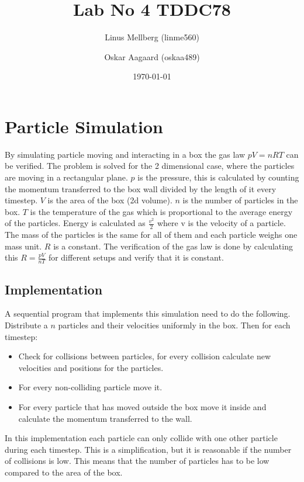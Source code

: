 \documentclass[a4paper,11pt]{article}
\begin{document}
\title{Lab No 4 TDDC78}
\author{Linus Mellberg (linme560) \and Oskar Aagaard (oskaa489)}
\date{\today}
\maketitle
\pagebreak
\thispagestyle{tcr}
\pagestyle{tcr}

\section{Particle Simulation}
By simulating particle moving and interacting in a box the gas law $pV = nRT$ can be verified.
The problem is solved for the 2 dimensional case, where the particles are moving in a rectangular plane.
$p$ is the pressure, this is calculated by counting the momentum transferred to the box wall divided by the length of it every timestep.
$V$ is the area of the box (2d volume).
$n$ is the number of particles in the box.
$T$ is the temperature of the gas which is proportional to the average energy of the particles.
Energy is calculated as $\frac{v^2}{2}$ where v is the velocity of a particle.
The mass of the particles is the same for all of them and each particle weighs one mass unit.
$R$ is a constant.
The verification of the gas law is done by calculating this $R=\frac{pV}{nT}$ for different setups and verify that it is constant.

\subsection{Implementation}
A sequential program that implements this simulation need to do the following.
Distribute a $n$ particles and their velocities uniformly in the box.
Then for each timestep:
\begin{itemize}
  \item Check for collisions between particles, for every collision calculate new velocities and positions for the particles.
  \item For every non-colliding particle move it.
  \item For every particle that has moved outside the box move it inside and calculate the momentum transferred to the wall.
\end{itemize}
In this implementation each particle can only collide with one other particle during each timestep.
This is a simplification, but it is reasonable if the number of collisions is low.
This means that the number of particles has to be low compared to the area of the box.
\end{document}

